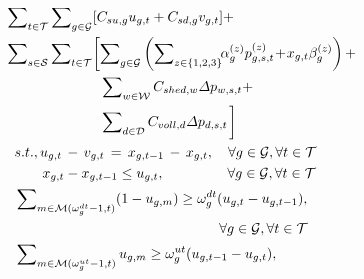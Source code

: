 \documentclass[lettersize,journal]{IEEEtran}
\begin{document}
\vspace{-0.5cm}
\begin{subequations}
	\begin{align}
		 & \!\!\!\! \sum\nolimits_{t\in\mathcal{T}} \sum\nolimits_{g\in\mathcal{G}} [C_{su, g} u_{g,t} + C_{sd,g} v_{g,t}] +                                                                                                                         \\
		 & \!\!\!\! \sum\nolimits_{s\in\mathcal{S}} \sum\nolimits_{t\in\mathcal{T}}\biggl [ \sum\nolimits_{g\in\mathcal{G}} \left( \sum\nolimits_{z\in\{1,2,3\}} \!\!\alpha_{g}^{(z)} p_{g,s,t}^{(z)} \!+\! x_{g,t} \beta_{g}^{(z)} \right) + \notag \\
		 & \qquad \qquad \qquad \left. \sum\nolimits_{w\in\mathcal{W}} C_{shed,w} \varDelta p_{w,s,t} +\right. \notag                                                                                                                                \\
		 & \qquad \qquad \qquad \left. \sum\nolimits_{d\in\mathcal{D}} C_{voll,d} \varDelta p_{d,s,t} \right. \biggr ] \notag                                                                                                                        \\
		 & s.t., u_{g,t} \,-\, v_{g,t} \,=\, x_{g,t-1}\, -\, x_{g,t},\quad \forall g\in\mathcal{G},\forall t\in\mathcal{T}                                                                                                                           \\
		 & \qquad x_{g,t} - x_{g,t-1} \leq u_{g,t}, \,\,\,\quad\quad\qquad \forall g\in\mathcal{G},\forall t\in\mathcal{T}                                                                                                                           \\
		 & \sum\nolimits_{m\in\mathcal{M}(\omega_g^{dt} - 1,t)} (1 - u_{g,m}) \geq \omega_{g}^{dt} (u_{g,t} - u_{g,t-1}), \notag                                                                                                                     \\
		 & \qquad\qquad\qquad\qquad\qquad\qquad\qquad\,\,\,\,  \forall g\in\mathcal{G},\forall t\in\mathcal{T}                                                                                                                                       \\
		 & \sum\nolimits_{m\in\mathcal{M}(\omega_g^{ut} - 1,t)} u_{g,m} \geq \omega_{g}^{ut} (u_{g,t-1} - u_{g,t}), \notag                                                                                                                           \\

\end{align}
\end{subequations}
\end{document}
